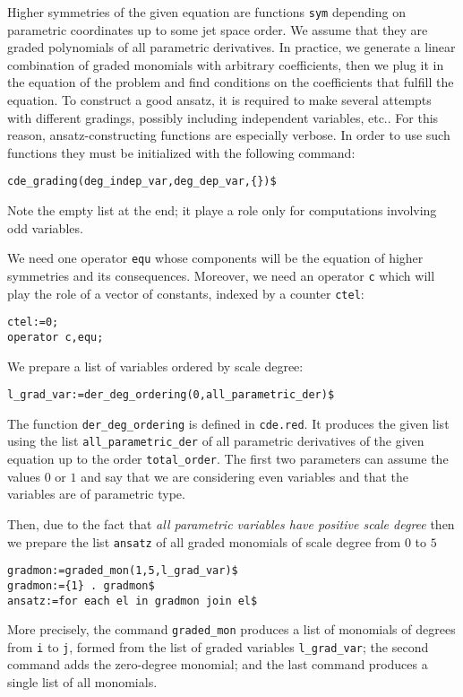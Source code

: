 Higher symmetries of the given equation are functions \texttt{sym} depending on
parametric coordinates up to some jet space order. We assume that they are
graded polynomials of all parametric derivatives. In practice, we generate a
linear combination of graded monomials with arbitrary coefficients, then we
plug it in the equation of the problem and find conditions on the coefficients
that fulfill the equation.  To construct a good ansatz, it is required to make
several attempts with different gradings, possibly including independent
variables, etc.. For this reason, ansatz-constructing functions are especially
verbose.  In order to use such functions they must be initialized with the
following command:
\begin{verbatim}
cde_grading(deg_indep_var,deg_dep_var,{})$
\end{verbatim}
Note the empty list at the end; it playe a role only for computations involving
odd variables.

We need one operator \texttt{equ} whose components will be the equation of
higher symmetries and its consequences. Moreover, we need an operator
\texttt{c} which will play the role of a vector of constants, indexed by a
counter \texttt{ctel}:
\begin{verbatim}
ctel:=0;
operator c,equ;
\end{verbatim}
We prepare a list of variables ordered by scale degree:
\begin{verbatim}
l_grad_var:=der_deg_ordering(0,all_parametric_der)$
\end{verbatim}
The function \texttt{der\_deg\_ordering} is defined in \texttt{cde.red}. It
produces the given list using the list \texttt{all\_parametric\_der} of all
parametric derivatives of the given equation up to the order
\texttt{total\_order}. The first two parameters can assume the values $0$ or $1$
and say that we are considering even variables and that the variables are of
parametric type.

Then, due to the fact that \emph{all parametric
  variables have positive scale degree} then we prepare the list
\texttt{ansatz} of all graded monomials of scale degree from $0$ to $5$
\begin{verbatim}
gradmon:=graded_mon(1,5,l_grad_var)$
gradmon:={1} . gradmon$
ansatz:=for each el in gradmon join el$
\end{verbatim}
More precisely, the command \texttt{graded\_mon} produces a list of monomials
of degrees from \texttt{i} to \texttt{j}, formed from the list of graded
variables \texttt{l\_grad\_var}; the second command adds the zero-degree
monomial; and the last command produces a single list of all monomials.

